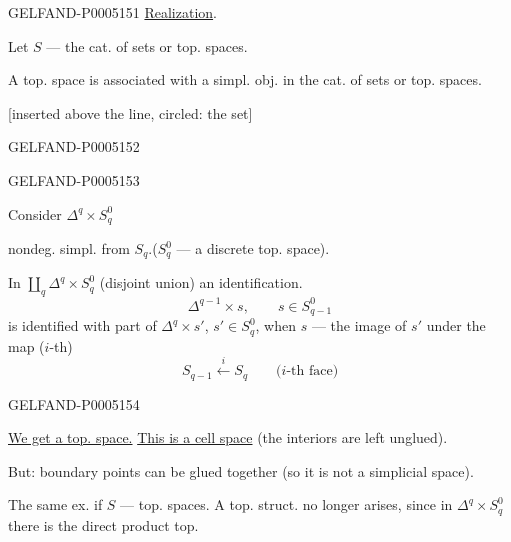 \begin{GelfandAdjacentEvidence}{GELFAND-P000515}{1}
\uline{Realization}.

Let $S$ — the cat. of sets or top. spaces.

A top. space is associated with a simpl. obj. in the cat. of sets or top. spaces.

 [inserted above the line, circled: the set] 
\end{GelfandAdjacentEvidence}
\begin{GelfandAdjacentEvidence}{GELFAND-P000515}{2}



 
\end{GelfandAdjacentEvidence}
\begin{GelfandAdjacentEvidence}{GELFAND-P000515}{3}


Consider $\Delta^q\times S_q^0$

\hspace*{3em}nondeg. simpl. from $S_q$.\qquad ($S_q^0$ — a discrete top. space).

In $\coprod_q\Delta^q\times S_q^0$ (disjoint union) an identification.
\[
\Delta^{q-1}\times s,\qquad s\in S_{q-1}^0
\]
is identified with part of $\Delta^q\times s'$, $s'\in S_q^0$,
when $s$ — the image of $s'$ under the map ($i$-th)
\[
S_{q-1}\overset{i}{\longleftarrow}S_q\qquad
\text{($i$-th face)}
\]
\end{GelfandAdjacentEvidence}
\begin{GelfandAdjacentEvidence}{GELFAND-P000515}{4}


\uline{We get a top. space.} \uline{This is a cell space} (the interiors are left unglued).

But: boundary points can be glued together (so it is not a simplicial space).

The same ex. if $S$ — top. spaces. A top. struct. no longer arises,
since in $\Delta^q\times S_q^0$ there is the direct product top.
\end{GelfandAdjacentEvidence}
